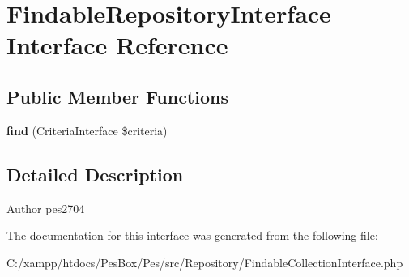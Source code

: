 \hypertarget{interface_pes_1_1_repository_1_1_findable_repository_interface}{}\section{Findable\+Repository\+Interface Interface Reference}
\label{interface_pes_1_1_repository_1_1_findable_repository_interface}
\subsection*{Public Member Functions}
\begin{DoxyCompactItemize}
\item 
\mbox{\label{interface_pes_1_1_repository_1_1_findable_repository_interface_ab3599f2abb8ba58d755cc8606f1d7724}} 
{\bfseries find} (Criteria\+Interface \$criteria)
\end{DoxyCompactItemize}


\subsection{Detailed Description}
\begin{DoxyAuthor}{Author}
pes2704 
\end{DoxyAuthor}


The documentation for this interface was generated from the following file\+:\begin{DoxyCompactItemize}
\item 
C\+:/xampp/htdocs/\+Pes\+Box/\+Pes/src/\+Repository/Findable\+Collection\+Interface.\+php\end{DoxyCompactItemize}
